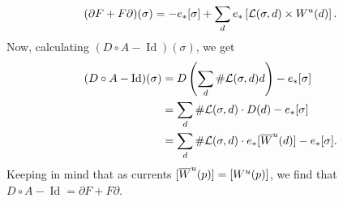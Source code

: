 \begin{myproof}
    \[
        (\partial F + F \partial)(\sigma) = -e_* [\sigma] +\sum_{d} e_*\left[\mathcal L(\sigma, d) \times W^u(d)\right].
    \]
    Now, calculating $(D  \circ A - \operatorname{Id})(\sigma)$, we get
    \begin{align*}
        (D  \circ A - \operatorname{Id})(\sigma) &=
        D\left(\sum_d \# \mathcal L(\sigma, d) d\right) - e_*[\sigma]\\
        &= \sum_d \# \mathcal L(\sigma, d) \cdot D(d) - e_*[\sigma]\\
        &= \sum_d \# \mathcal L(\sigma, d) \cdot e_*[\overline{W}^u(d)] - e_*[\sigma]
    .\end{align*} 
    Keeping in mind that as currents $[\overline{W}^u(p)] = [W^u(p)]$, we find that $D  \circ  A - \operatorname{Id} = \partial F + F \partial$.
\end{myproof}

